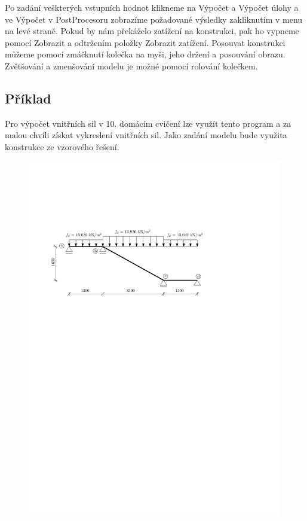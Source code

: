 \documentclass[12pt,fleqn]{article}
\begin{document}
Po zadání veškterých vstupních hodnot klikneme na Výpočet a Výpočet úlohy a ve Výpočet v PostProcesoru zobrazíme požadované výsledky zakliknutím v menu na levé straně. Pokud by nám překáželo zatížení na konstrukci, pak ho vypneme pomocí Zobrazit a odtržením položky Zobrazit zatížení. Posouvat konstrukci můžeme pomocí zmáčknutí kolečka na myši, jeho držení a posouvání obrazu. Zvětšování a zmenšování modelu je možné pomocí rolování kolečkem.

\subsection*{Příklad}

Pro výpočet vnitřních sil v 10. domácím cvičení lze využít tento program a za malou chvíli získat vykreslení vnitřních sil. Jako zadání modelu bude využita konstrukce ze vzorového řešení.

\begin{figure}[ht]
\centering
\includegraphics[width=0.99\textwidth]{figs/zadani.pdf}
\end{figure}
\end{document}
